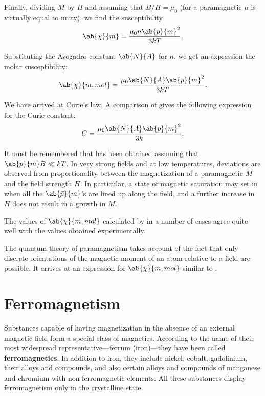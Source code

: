 \noindent
Finally, dividing $M$ by $H$ and assuming that $B/H = \mu_0$ (for a paramagnetic $\mu$ is virtually equal to unity), we find the susceptibility
\begin{equation}\label{eq:7_57}
    \ab{\chi}{m} = \frac{\mu_0 n \ab{p}{m}^2}{3kT}.
\end{equation}

Substituting the Avogadro constant $\ab{N}{A}$ for $n$, we get an expression the molar susceptibility:
\begin{equation}\label{eq:7_58}
    \ab{\chi}{m,mol} = \frac{\mu_0 \ab{N}{A} \ab{p}{m}^2}{3kT}.
\end{equation}

\noindent
We have arrived at Curie's law.
A comparison of  gives the following expression for the Curie constant:
\begin{equation}\label{eq:7_59}
    C = \frac{\mu_0 \ab{N}{A} \ab{p}{m}^2}{3k}.
\end{equation}

It must be remembered that  has been obtained assuming that $\ab{p}{m}B\ll kT$.
In very strong fields and at low temperatures, deviations are observed from proportionality between the magnetization of a paramagnetic $M$ and the field strength $H$.
In particular, a state of magnetic saturation may set in when all the $\ab{\vec{p}}{m}$'s are lined up along the field, and a further increase in $H$ does not result in a growth in $M$.

The values of $\ab{\chi}{m,mol}$ calculated by  in a number of cases agree quite well with the values obtained experimentally.

The quantum theory of paramagnetism takes account of the fact that only discrete orientations of the magnetic moment of an atom relative to a field are possible.
It arrives at an expression for $\ab{\chi}{m,mol}$ similar to .

\section{Ferromagnetism}\label{sec:7_9}

Substances capable of having magnetization in the absence of an external magnetic field form a special class of magnetics.
According to the name of their most widespread representative---ferrum (iron)---they have been called \textbf{ferromagnetics}.
In addition to iron, they include nickel, cobalt, gadolinium, their alloys and compounds, and also certain alloys and compounds of manganese and chromium with non-ferromagnetic elements.
All these substances display ferromagnetism only in the crystalline state.

